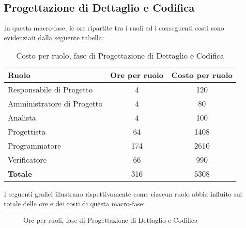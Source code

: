 \subsection{Progettazione di Dettaglio e Codifica}
In questa macro-fase, le ore ripartite tra i ruoli ed i conseguenti costi sono evidenziati dalla seguente tabella:

\begin{table}[h]
\centering
\begin{tabular}{|l|c|c|}
	\toprule
	\textbf{Ruolo} & \textbf{Ore per ruolo} & \textbf{Costo per ruolo} \\
		
	\midrule
	Responsabile di Progetto & 4 & 120 \\
	Amministratore di Progetto & 4 & 80 \\ 
	Analista & 4 & 100 \\
	Progettista & 64 & 1408 \\
	Programmatore & 174 & 2610 \\
	Verificatore & 66 & 990 \\
	\midrule
	\textbf{Totale} & 316 & 5308 \\
	
	\bottomrule
\end{tabular}
\caption{Costo per ruolo, fase di Progettazione di Dettaglio e Codifica}
\end{table}

\newpage
\noindent I seguenti grafici illustrano rispettivamente come ciascun ruolo abbia influito sul totale delle ore e dei costi di questa macro-fase:
\def\cyclelist{{"yellow","magenta","orange","green","blue","red"}}
\begin{figure}[h]
\centering
{}
\caption{Ore per ruoli, fase di Progettazione di Dettaglio e Codifica}
\end{figure}

